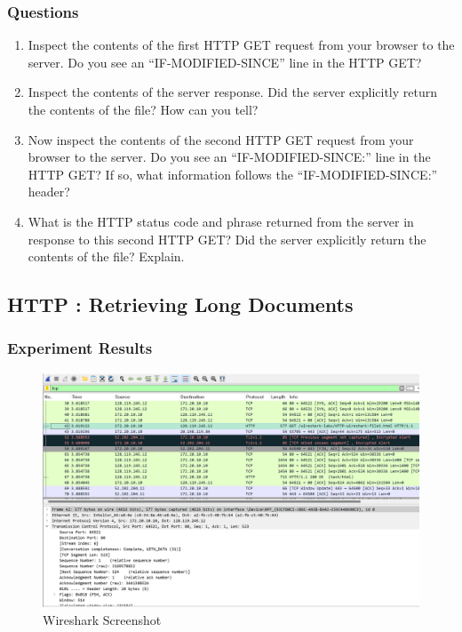     \subsubsection*{Questions}
        \begin{enumerate}[label=\bfseries Problem \arabic*:,leftmargin=*,labelindent=1em]
        \addtocounter{enumi}{7}
            \item Inspect the contents of the first HTTP GET request from your browser to the server.
            Do you see an “IF-MODIFIED-SINCE” line in the HTTP GET? \\[0.2mm]
            \soln
            
            \item Inspect the contents of the server response. Did the server explicitly return 
            the contents of the file? How can you tell? \\[0.2mm]
            \soln
            
            \item Now inspect the contents of the second HTTP GET request from your browser to the server. Do you see an “IF-MODIFIED-SINCE:” line in the HTTP GET? If so, what information follows the “IF-MODIFIED-SINCE:” header?\\[0.2mm]
            \soln
            
            \item What is the HTTP status code and phrase returned from the server in response to this second HTTP GET? Did the server explicitly return the contents of the file? Explain.\\[0.2mm]
            \soln
            
        \end{enumerate}
\subsection{HTTP : Retrieving Long Documents}
    \subsubsection*{Experiment Results}
    	\begin{figure}[!h]\centering
			\includegraphics[width=.95\textwidth]{image/week01/2-9.png}
			\caption{Wireshark Screenshot}
    	\end{figure}
    \vspace{-4mm}  
